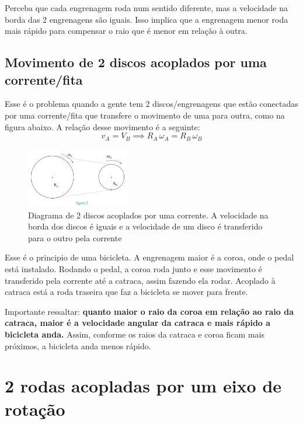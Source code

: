 \documentclass[12pt]{extarticle}
\newcommand{\<}{\langle}
\renewcommand{\>}{\rangle}
\theoremstyle{definition}
\begin{document}
Perceba que cada engrenagem roda num sentido diferente, mas a velocidade na borda das 2 engrenagens são iguais. Isso implica que a engrenagem menor roda mais rápido para compensar o raio que é menor em relação à outra.

\subsection{Movimento de 2 discos acoplados por uma corrente/fita}

Esse é o problema quando a gente tem 2 discos/engrenagens que estão conectadas por uma corrente/fita que transfere o movimento de uma para outra, como na figura abaixo. A relação desse movimento é a seguinte:
\begin{equation}
    v_A=V_B \implies R_A\,\omega_A = R_B\,\omega_B
\end{equation}

\begin{figure}[H]
    \centering
    \includegraphics[width=0.4\textwidth]{full-1-154d331c63.jpg}
    \caption{Diagrama de 2 discos acoplados por uma corrente. A velocidade na borda dos discos é iguais e a velocidade de um disco é transferido para o outro pela corrente}
    \label{fig:my_label}
\end{figure}

Esse é o principio de uma bicicleta. A engrenagem maior é a coroa, onde o pedal está instalado. Rodando o pedal, a coroa roda junto e esse movimento é transferido pela corrente até a catraca, assim fazendo ela rodar. Acoplado à catraca está a roda traseira que faz a bicicleta se mover para frente.

Importante ressaltar: \textbf{quanto maior o raio da coroa em relação ao raio da catraca, maior é a velocidade angular da catraca e mais rápido a bicicleta anda.} Assim, conforme os raios da catraca e coroa ficam mais próximos, a bicicleta anda menos rápido.

\section{2 rodas acopladas por um eixo de rotação}
\end{document}
